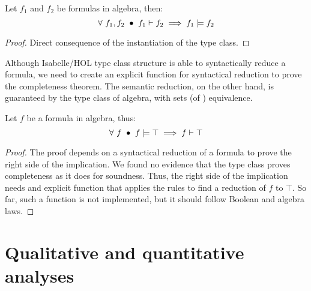 
\begin{Theo}[Soundness]
Let $f_1$ and $f_2$ be formulas in \ac{algebra}, then:
%
\begin{equation}
\forall~ f_1, f_2 ~\bullet~ f_1\vdash{f_2} \implies f_1\models{f_2}
\end{equation}
%
\end{Theo}
%
\begin{proof}
Direct consequence of the instantiation of the type class.
\end{proof}

Although Isabelle/HOL type class structure is able to syntactically reduce a formula, we need to create an explicit function for syntactical reduction to prove the completeness theorem.
The semantic reduction, on the other hand, is guaranteed by the type class of \ac{algebra}, with sets (of \distinctlists) equivalence.

\begin{Theo}[Completeness]
Let $f$ be a formula in \ac{algebra}, thus:
%
\begin{equation}
\forall~ f ~\bullet~ f\models{\top} \implies f\vdash{\top}
\end{equation}
%
\end{Theo}
%
\begin{proof}
The proof depends on a syntactical reduction of a formula to prove the right side of the implication.
We found no evidence that the type class proves completeness as it does for soundness.
Thus, the right side of the implication needs and explicit function that applies the rules to find a reduction of $f$ to $\top$.
So far, such a function is not implemented, but it should follow Boolean and \ac{algebra} laws.
\end{proof}


\section{Qualitative and quantitative analyses}
\label{sec:qualitative-quantitative-analyses}

